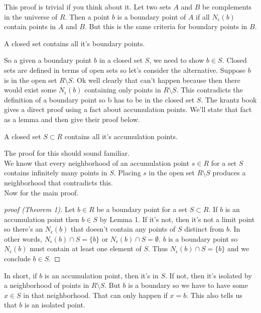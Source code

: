 \documentclass{article}
\begin{document}
This proof is trivial if you think about it. Let two sets \( A \) and \( B \) be complements
in the universe of \( R \). Then a point \( b \) is a boundary point of \( A \) if all
\( N_\epsilon(b) \) contain points in \( A \) and \( B \). But this is the same
criteria for boundary points in  \( B \).

\begin{theorem}
    A closed set contains all it's boundary points.
\end{theorem}

So a given a boundary point \( b \) in a closed set \( S \), we need to show \( b \in S \).
Closed sets are defined in terms of open sets so let's consider the alternative. 
Suppose \( b \) is in the open set \( R \setminus S \). Ok well clearly that can't
happen because then there would exist some \( N_\epsilon(b) \) containing only
points in \( R \setminus S \). This contradicts the definition of a 
boundary point so b has to be in the closed set \( S \).
\medbreak
The krantz book gives a direct proof using a fact about accumulation points. 
We'll state that fact as a lemma and then give their proof below.

\begin{lemma}
    A closed set \( S \subset R \) contains all it's accumulation points.
\end{lemma}

The proof for this should sound familiar.\\ We know that every neighborhood of an
accumulation point \( s \in R \) for a set \( S \) contains infinitely many points in \( S \). Placing \( s \)
in the open set \( R \setminus S \) produces a neighborhood that contradicts this. \\
Now for the main proof.

\begin{proof}[proof (Theorem 1)]
    Let \( b \in R \) be a boundary point for a set \( S \subset R \). If \( b \) is 
    an accumulation point then \( b \in S \) by Lemma 1. If it's not, then it's not
    a limit point so there's an \( N_\epsilon(b) \) that doesn't contain any points
    of \( S \) distinct from \( b \). In other words, \( N_\epsilon(b) \cap S = \{b\} \) or 
    \( N_\epsilon(b) \cap S = \emptyset \). \( b \) is a boundary point so
    \( N_\epsilon(b)  \) must contain at least one element of \( S \). Thus
    \( N_\epsilon(b) \cap S = \{b\} \) and we conclude \( b \in S \).
\end{proof}

In short, if \( b \) is an accumulation point, then it's in \( S \). If not, then 
it's isolated by a neighborhood of points in \( R \setminus S \). But \( b \) is a boundary
so we have to have some \( x \in S \) in that neighborhood. That can only happen
if \( x = b \). This also tells us that \( b \) is an isolated point.
\end{document}
